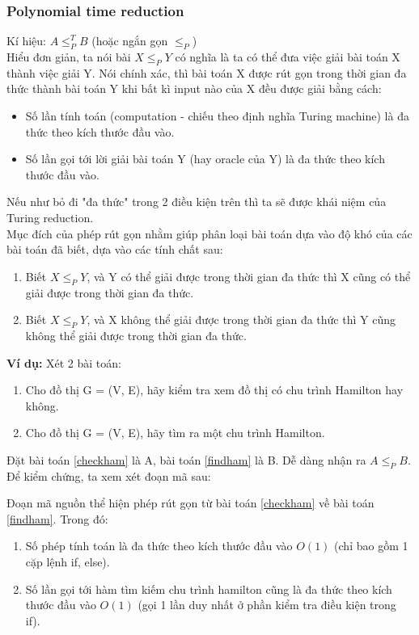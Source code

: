\documentclass[a4paper 14pt]{article}
\begin{document}
			\subsubsection{Polynomial time reduction}
				Kí hiệu: $A \leq_P^T B$ (hoặc ngắn gọn $\leq_P$)\\
				Hiểu đơn giản, ta nói bài $X \leq_P Y$ có nghĩa là ta có thể đưa việc giải bài toán X thành việc giải Y. Nói chính xác, thì bài toán X được rút gọn trong thời gian đa thức thành bài toán Y khi bất kì input nào của X đều được giải bằng cách:\\
				\begin{itemize}
					\item Số lần tính toán (computation - chiếu theo định nghĩa Turing machine) là đa thức theo kích thước đầu vào.
					\item Số lần gọi tới lời giải bài toán Y (hay oracle của Y) là đa thức theo kích thước đầu vào.
				\end{itemize}
				Nếu như bỏ đi "đa thức" trong 2 điều kiện trên thì ta sẽ được khái niệm của Turing reduction.\\
				Mục đích của phép rút gọn nhằm giúp phân loại bài toán dựa vào độ khó của các bài toán đã biết, dựa vào các tính chất sau:
				\begin{enumerate}
					\item Biết $X \leq_P Y$, và Y có thể giải được trong thời gian đa thức thì X cũng có thể giải được trong thời gian đa thức.
					\item Biết $X \leq_P Y$, và X không thể giải được trong thời gian đa thức thì Y cũng không thể giải được trong thời gian đa thức.
				\end{enumerate}
				
				\textbf{Ví dụ:}
				Xét 2 bài toán:
				\begin{enumerate}
					\item\label{checkham} Cho đồ thị G = (V, E), hãy kiểm tra xem đồ thị có chu trình Hamilton hay không.
					\item\label{findham} Cho đồ thị G = (V, E), hãy tìm ra một chu trình Hamilton.
				\end{enumerate}
				Đặt bài toán \ref{checkham} là A, bài toán \ref{findham} là B. Dễ dàng nhận ra $A \leq_P B$. Để kiểm chứng, ta xem xét đoạn mã sau:
				
				Đoạn mã nguồn thể hiện phép rút gọn từ bài toán \ref{checkham} về bài toán \ref{findham}. Trong đó:
				\begin{enumerate} 
					\item Số phép tính toán là đa thức theo kích thước đầu vào $O(1)$ (chỉ bao gồm 1 cặp lệnh if, else).
					\item Số lần gọi tới hàm tìm kiếm chu trình hamilton cũng là đa thức theo kích thước đầu vào $O(1)$ (gọi 1 lần duy nhất ở phần kiểm tra điều kiện trong if).
				\end{enumerate}
\end{document}
